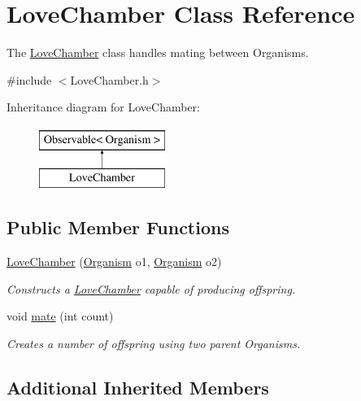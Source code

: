 \hypertarget{class_love_chamber}{}\section{Love\+Chamber Class Reference}
\label{class_love_chamber}


The \hyperlink{class_love_chamber}{Love\+Chamber} class handles mating between Organisms.  




{\ttfamily \#include $<$Love\+Chamber.\+h$>$}

Inheritance diagram for Love\+Chamber\+:\begin{figure}[H]
\begin{center}
\leavevmode
\includegraphics[height=2.000000cm]{class_love_chamber}
\end{center}
\end{figure}
\subsection*{Public Member Functions}
\begin{DoxyCompactItemize}
\item 
\hyperlink{class_love_chamber_afd8934456036b6252e0e968c26ffb04e}{Love\+Chamber} (\hyperlink{class_organism}{Organism} o1, \hyperlink{class_organism}{Organism} o2)
\begin{DoxyCompactList}\small\item\em Constructs a \hyperlink{class_love_chamber}{Love\+Chamber} capable of producing offspring. \end{DoxyCompactList}\item 
void \hyperlink{class_love_chamber_a9dafc3e7dff1ee60359ca9b78db6e13a}{mate} (int count)
\begin{DoxyCompactList}\small\item\em Creates a number of offspring using two parent Organisms. \end{DoxyCompactList}\end{DoxyCompactItemize}
\subsection*{Additional Inherited Members}


